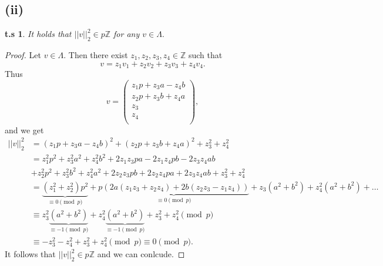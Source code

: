 \documentclass[10pt,a4paper]{article}
\newtheorem*{zz*}{t.s}
\newcommand{\ZZ}{\mathbb{Z}}
\begin{document}
\subsection*{(ii)}
	\begin{zz*}
		It holds that $||v||_2^2\in p\ZZ$ for any $v\in \Lambda.$
	\end{zz*}
	\begin{proof}
		Let $v\in \Lambda.$ Then there exist $z_1, z_2, z_3, z_4\in \ZZ$ such that
		\[v = z_1v_1+z_2v_2 + z_3v_3 + z_4v_4.\]
		Thus
		\[
		v = \begin{pmatrix}
			z_1 p + z_3 a - z_4 b \\
			z_2 p + z_3 b + z_4 a \\
			z_3 \\
			z_4 \\
		\end{pmatrix},
		\]
		and we get
		\begin{align*}
			||v||_2^2 &= (z_1 p + z_3 a - z_4 b)^2 + (z_2 p + z_3 b + z_4 a)^2 + z_3^2 + z_4^2\\
			&= z_1^2 p^2 + z_3^2 a^2 + z_4^2 b^2 + 2z_1 z_3 p a - 2z_1 z_4 p b - 2z_3 z_4 a b\\
			&+ z_2^2 p^2 + z_3^2 b^2 + z_4^2 a^2 + 2z_2 z_3 p b + 2z_2 z_4 p a + 2z_3 z_4 a b + z_3^2 + z_4^2\\
			&= \underbrace{(z_1^2 + z_2^2)p^2}_{\equiv 0 \pmod{p}} +\underbrace{p(2a(z_1z_3 + z_2z_4) + 2b(z_2z_3 - z_1z_4))}_{\equiv 0 \pmod{p}} +z_3(a^2 + b^2) + z_4^2(a^2 + b^2)+\dots\\
			&\equiv z_3^2\underbrace{(a^2 + b^2)}_{\equiv -1\pmod{p}} + z_4^2\underbrace{(a^2 + b^2)}_{\equiv -1\pmod{p}}+z_3^2 + z_4^2 \pmod{p}\\
			&\equiv -z_3^2 - z_4^2 + z_3^2 + z_4^2 \pmod{p}\equiv 0\pmod{p}.
		\end{align*}
	It follows that $||v||_2^2\in p\ZZ$ and we can conlcude.
	\end{proof}
\end{document}
